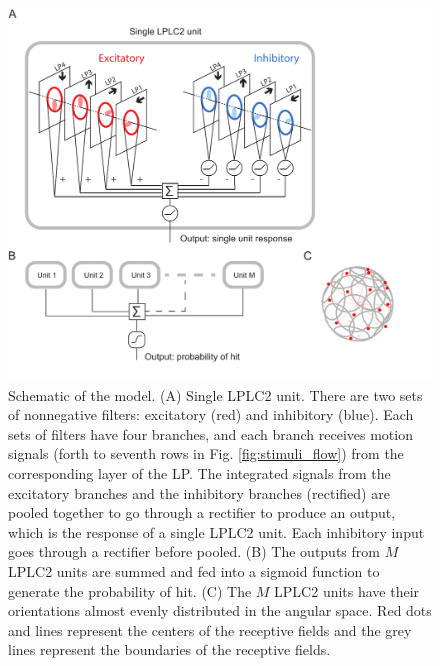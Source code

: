 \documentclass[9pt,lineno]{elife}
\begin{document}
\begin{figure}
\end{figure}

\begin{figure}
\includegraphics[width=\linewidth]{figures/model_sketch_paper.pdf}
\caption{Schematic of the model. (A) Single LPLC2 unit. There are two sets of nonnegative filters: excitatory (red) and inhibitory (blue). Each sets of filters have four branches, and each branch receives motion signals (forth to seventh rows in Fig. \ref{fig:stimuli_flow}) from the corresponding layer of the LP. The integrated signals from the excitatory branches and the inhibitory branches (rectified) are pooled together to go through a rectifier to produce an output, which is the response of a single LPLC2 unit. Each inhibitory input goes through a rectifier before pooled. (B) The outputs from $M$ LPLC2 units are summed and fed into a sigmoid function to generate the probability of hit. (C) The $M$ LPLC2 units have their orientations almost evenly distributed in the angular space. Red dots and lines represent the centers of the receptive fields and the grey lines represent the boundaries of the receptive fields.}

\end{figure}
\end{document}
